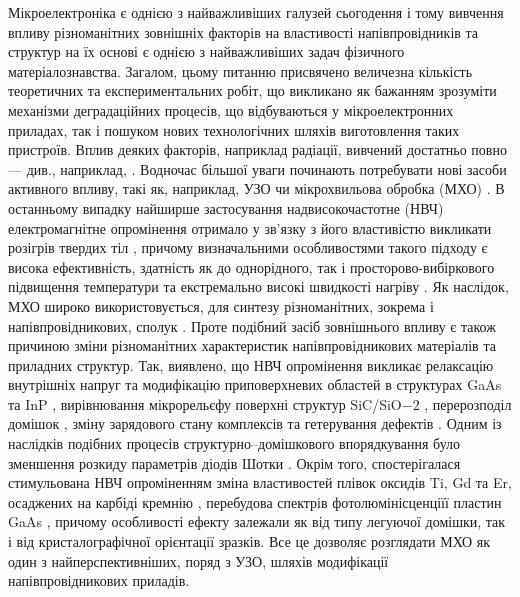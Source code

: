 \documentclass[a4paper,14pt,oneside,openany]{memoir}
\begin{document}
Мікроелектроніка є однією з найважливіших галузей сьогодення і тому
вивчення впливу різноманітних зовнішніх факторів на властивості напівпровідників та структур на їх основі є однією з найважливіших задач фізичного матеріалознавства.
Загалом, цьому питанню присвячено величезна кількість теоретичних та експериментальних робіт,
що викликано як бажанням зрозуміти механізми деградаційних процесів, що відбуваються у мікроелектронних приладах,
так і пошуком нових технологічних шляхів виготовлення таких пристроїв.
Вплив деяких факторів, наприклад радіації, вивчений достатньо повно --- див., наприклад, \cite{KorshunovBook,Kozlovs}.
Водночас більшої уваги починають потребувати нові засоби активного впливу, такі як, наприклад, УЗО чи мікрохвильова обробка (МХО) \cite{MW:Rev,Rjanov1981,paton1993,Vinnik1989,ZOHM2000,BHUNIA1998,Bacherikov2003r,Pashkov1994r,
Boltovets,Kr1996,Milenin1994,BelyaevIntac,ASHKINADZE1996,ProcSPIE,Venger1999,Belyaev1998JTFr,
Bacherikov2008,Konakova2015,Konakova2012FTP}.
В останньому випадку найширше застосування надвисокочастотне (НВЧ) електромагнітне опромінення отримало
у зв'язку з його властивістю викликати розігрів твердих тіл \cite{MW:Rev,ZOHM2000,paton1993}, причому визначальними особливостями такого підходу є висока ефективність, здатність як до однорідного, так і просторово-вибіркового підвищення температури та екстремально високі швидкості нагріву \cite{MW:Rev}.
Як наслідок, МХО широко використовується, для синтезу різноманітних, зокрема і напівпровідникових, сполук \cite{MW:Rev,BHUNIA1998}.
Проте подібний засіб зовнішнього впливу є також причиною зміни різноманітних характеристик напівпровідникових матеріалів та приладних структур.
Так, виявлено, що НВЧ опромінення викликає релаксацію внутрішніх напруг та модифікацію приповерхневих
областей в структурах GaAs та InP \cite{Boltovets,Pashkov1994r,Kr1996,Milenin1994,BelyaevIntac,ProcSPIE,Venger1999,Konakova2015,Konakova2012FTP},
вирівнювання мікрорельєфу поверхні структур SiC/SiO$-2$ \cite{Bacherikov2003r},
перерозподіл домішок \cite{Bacherikov2003r,Belyaev1998JTFr,Konakova2015},
зміну зарядового стану комплексів \cite{Milenin1994}
та гетерування дефектів \cite{Belyaev1998JTFr}.
Одним із наслідків подібних процесів структурно--домішкового впорядкування було зменшення розкиду параметрів діодів Шотки \cite{Milenin1994,Belyaev1998JTFr}.
Окрім того, спостерігалася стимульована НВЧ опроміненням
зміна властивостей плівок оксидів Ti, Gd та Er, осаджених на карбіді кремнію \cite{Bacherikov2008},
перебудова спектрів фотолюмінісценціїї пластин GaAs \cite{BelyaevIntac,ProcSPIE,Belyaev1998JTFr},
причому особливості ефекту залежали як від типу легуючої домішки, так і від кристалографічної орієнтації зразків.
Все це дозволяє розглядати МХО як один з найперспективніших, поряд з УЗО, шляхів модифікації напівпровідникових приладів.
\end{document}
